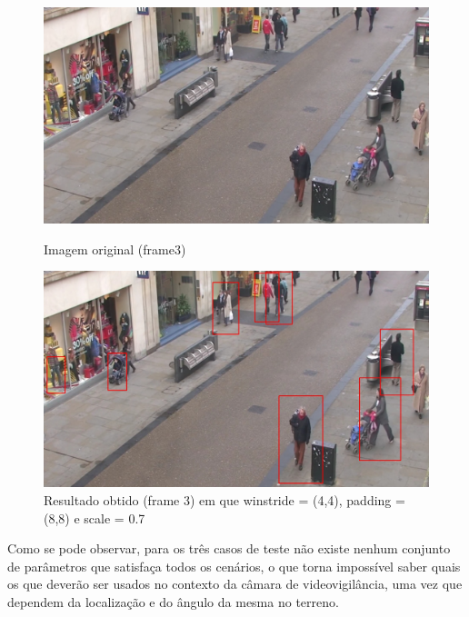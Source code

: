 \begin{figure}[h]
	\centering
	\begin{minipage}[b]{0.49\textwidth}
		\centering
		\includegraphics[width=\textwidth]{img/vision/exemplos/frame3.png}
		\caption[Imagem original (frame3)]{Imagem original (frame3) \newline \newline}
		\label{bluetth05-res}
	\end{minipage}
	\hfill
	\begin{minipage}[b]{0.49\textwidth}
		\centering
		\includegraphics[width=\textwidth]{img/vision/exemplos/result_frame3.jpg}
		\caption[Resultado obtido (frame 3)]{Resultado obtido (frame 3) em que winstride = (4,4), padding = (8,8) e scale = 0.7}
		\label{comimageesqu1ema}
	\end{minipage}
\end{figure}



Como se pode observar, para os três casos de teste não existe nenhum conjunto de parâmetros que satisfaça todos os cenários, o que torna impossível saber quais os que deverão ser usados no contexto da câmara de videovigilância, uma vez que dependem da localização e do ângulo da mesma no terreno. 





